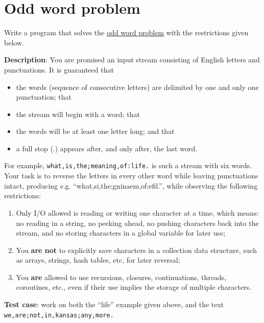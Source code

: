 \pagebreak{}
\section*{Odd word problem}

Write a program that solves the
\href{http://c2.com/cgi/wiki?OddWordProblem}{odd word problem} with the
restrictions given below.

\textbf{Description}: You are promised an input stream consisting of
English letters and punctuations. It is guaranteed that

\begin{itemize}
\item
  the words (sequence of consecutive letters) are delimited by one and
  only one punctuation; that
\item
  the stream will begin with a word; that
\item
  the words will be at least one letter long; and that
\item
  a full stop (.) appears after, and only after, the last word.
\end{itemize}

For example, \texttt{what,is,the;meaning,of:life.} is such a stream with
six words. Your task is to reverse the letters in every other word while
leaving punctuations intact, producing e.g.
``what,si,the;gninaem,of:efil.'', while observing the following
restrictions:

\begin{enumerate}
\item
  Only I/O allowed is reading or writing one character at a time, which
  means: no reading in a string, no peeking ahead, no pushing characters
  back into the stream, and no storing characters in a global variable
  for later use;
\item
  You \textbf{are not} to explicitly save characters in a collection
  data structure, such as arrays, strings, hash tables, etc, for later
  reversal;
\item
  You \textbf{are} allowed to use recursions, closures, continuations,
  threads, coroutines, etc., even if their use implies the storage of
  multiple characters.
\end{enumerate}

\textbf{Test case}: work on both the ``life'' example given above, and
the text \\ \texttt{we,are;not,in,kansas;any,more.}


